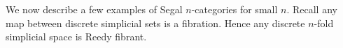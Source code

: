 \documentclass{amsart}
\begin{document}
%


 We now describe a few examples of Segal $n$-categories for small $n$. Recall any map between discrete simplicial sets is a fibration. Hence any discrete $n$-fold simplicial space is Reedy fibrant. 
\end{document}
